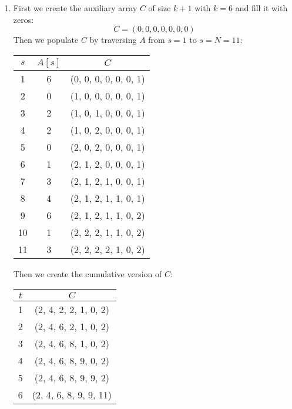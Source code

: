 \documentclass{article}
\begin{document}
\begin{enumerate}[1.]
    \newpage
    \item First we create the auxiliary array $C$ of size $k + 1$ with $k = 6$ and fill it with zeros:
    \begin{equation*}
        C = (0, 0, 0, 0, 0, 0, 0)
    \end{equation*}
    Then we populate $C$ by traversing $A$ from $s = 1$ to $s = N = 11$:
    \begin{table}[ht]
		\centering
		\begin{tabular}{ccc}
			\toprule
			$s$ & $A[s]$ & $C$\\
			\midrule
            1 & 6 & (0, 0, 0, 0, 0, 0, 1)\\
            2 & 0 & (1, 0, 0, 0, 0, 0, 1)\\
            3 & 2 & (1, 0, 1, 0, 0, 0, 1)\\
            4 & 2 & (1, 0, 2, 0, 0, 0, 1)\\
            5 & 0 & (2, 0, 2, 0, 0, 0, 1)\\
            6 & 1 & (2, 1, 2, 0, 0, 0, 1)\\
            7 & 3 & (2, 1, 2, 1, 0, 0, 1)\\
            8 & 4 & (2, 1, 2, 1, 1, 0, 1)\\
            9 & 6 & (2, 1, 2, 1, 1, 0, 2)\\
            10 & 1 & (2, 2, 2, 1, 1, 0, 2)\\
            11 & 3 & (2, 2, 2, 2, 1, 0, 2)\\
			\bottomrule
		\end{tabular}
	\end{table}
    
    Then we create the cumulative version of $C$:
    \begin{table}[ht]
		\centering
		\begin{tabular}{cc}
			\toprule
			$t$ & $C$\\
			\midrule
            1 & (2, 4, 2, 2, 1, 0, 2)\\
            2 & (2, 4, 6, 2, 1, 0, 2)\\
            3 & (2, 4, 6, 8, 1, 0, 2)\\
            4 & (2, 4, 6, 8, 9, 0, 2)\\
            5 & (2, 4, 6, 8, 9, 9, 2)\\
            6 & (2, 4, 6, 8, 9, 9, 11)\\
			\bottomrule
		\end{tabular}
	\end{table}
	

\end{enumerate}
\end{document}
